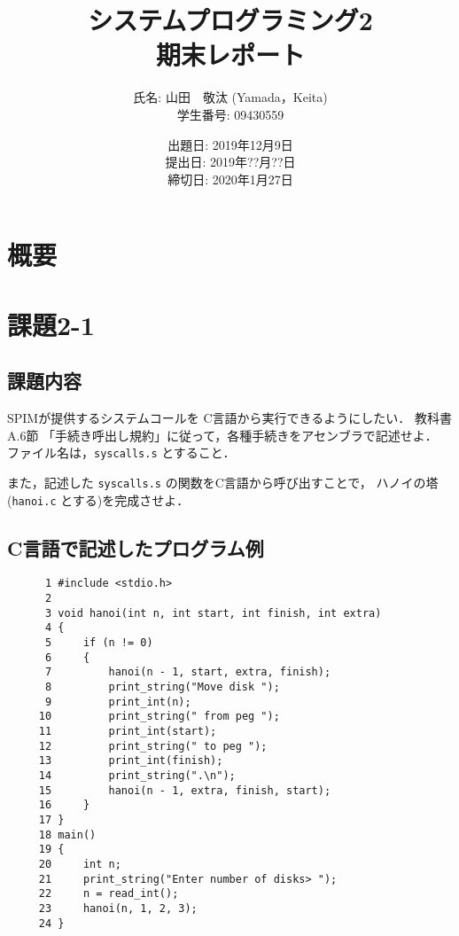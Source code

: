 \documentclass[a4j,11pt]{jarticle}
\title{システムプログラミング2 \\
       期末レポート}
\author{氏名: 山田　敬汰 (Yamada，Keita) \\
        学生番号: 09430559}
\date{出題日: 2019年12月9日 \\   %
      提出日: 2019年??月??日 \\
      締切日: 2020年1月27日 \\}  %
\begin{document}
\maketitle


\section{概要}

\section{課題2-1}
\subsection{課題内容}
SPIMが提供するシステムコールを C言語から実行できるようにしたい． 教科書A.6節 「手続き呼出し規約」に従って，各種手続きをアセンブラで記述せよ． ファイル名は，{\tt syscalls.s} とすること．

また，記述した {\tt syscalls.s} の関数をC言語から呼び出すことで， ハノイの塔({\tt hanoi.c} とする)を完成させよ．

\subsection{C言語で記述したプログラム例}

\begin{verbatim}
      1	#include <stdio.h>
      2	
      3	void hanoi(int n, int start, int finish, int extra)
      4	{
      5	    if (n != 0)
      6	    {
      7	        hanoi(n - 1, start, extra, finish);
      8	        print_string("Move disk ");
      9	        print_int(n);
     10	        print_string(" from peg ");
     11	        print_int(start);
     12	        print_string(" to peg ");
     13	        print_int(finish);
     14	        print_string(".\n");
     15	        hanoi(n - 1, extra, finish, start);
     16	    }
     17	}
     18	main()
     19	{
     20	    int n;
     21	    print_string("Enter number of disks> ");
     22	    n = read_int();
     23	    hanoi(n, 1, 2, 3);
     24	}     
\end{verbatim}
\end{document}
